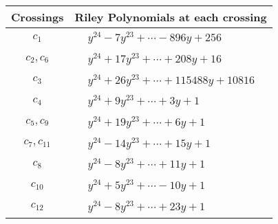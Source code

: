 \documentclass[1p]{elsarticle_modified}
\theoremstyle{definition}
\begin{document}
\begin{tabular}{m{50pt}|m{274pt}}
Crossings & \hspace{64pt}Riley Polynomials at each crossing \\
\hline $$\begin{aligned}c_{1}\end{aligned}$$&$\begin{aligned}
&y^{24}-7 y^{23}+\cdots-896 y+256
\end{aligned}$\\
\hline $$\begin{aligned}c_{2},c_{6}\end{aligned}$$&$\begin{aligned}
&y^{24}+17 y^{23}+\cdots+208 y+16
\end{aligned}$\\
\hline $$\begin{aligned}c_{3}\end{aligned}$$&$\begin{aligned}
&y^{24}+26 y^{23}+\cdots+115488 y+10816
\end{aligned}$\\
\hline $$\begin{aligned}c_{4}\end{aligned}$$&$\begin{aligned}
&y^{24}+9 y^{23}+\cdots+3 y+1
\end{aligned}$\\
\hline $$\begin{aligned}c_{5},c_{9}\end{aligned}$$&$\begin{aligned}
&y^{24}+19 y^{23}+\cdots+6 y+1
\end{aligned}$\\
\hline $$\begin{aligned}c_{7},c_{11}\end{aligned}$$&$\begin{aligned}
&y^{24}-14 y^{23}+\cdots+15 y+1
\end{aligned}$\\
\hline $$\begin{aligned}c_{8}\end{aligned}$$&$\begin{aligned}
&y^{24}-8 y^{23}+\cdots+11 y+1
\end{aligned}$\\
\hline $$\begin{aligned}c_{10}\end{aligned}$$&$\begin{aligned}
&y^{24}+5 y^{23}+\cdots-10 y+1
\end{aligned}$\\
\hline $$\begin{aligned}c_{12}\end{aligned}$$&$\begin{aligned}
&y^{24}-8 y^{23}+\cdots+23 y+1
\end{aligned}$\\
\hline
\end{tabular}\\~\\
\end{document}
